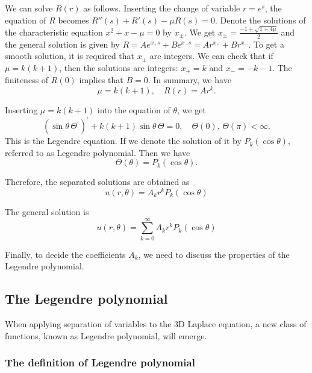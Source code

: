 We can solve $R(r)$ as follows. Inserting the change of variable $r = e^s$, the equation of $R$ becomes $R''(s) + R'(s) - \mu R(s) = 0$. Denote the solutions of the characteristic equation $x^2 + x - \mu = 0$ by $x_{\pm}$. We get $x_{\pm} = \frac{-1 \pm \sqrt{1 + 4\mu}}{2}$ and the general solution is given by $R = Ae^{x_+ s} + Be^{x_- s} = Ar^{x_+} + Br^{x_-}$. To get a smooth solution, it is required that $x_{\pm}$ are integers. We can check that if $\mu = k(k+1)$, then the solutions are integers: $x_+ = k$ and $x_- = -k-1$. The finiteness of $R(0)$ implies that $B = 0$. In summary, we have 
\begin{equation}\label{eq.solve_Laplace_3D_R}
    \mu = k(k+1),\quad R(r) = Ar^{k}.
\end{equation}

Inserting $\mu = k(k+1)$ into the equation of $\theta$, we get 
\begin{equation}\label{eq.Legendre'}
    (\sin\theta\,\Theta^{\prime})^{\prime}+k(k+1) \sin\theta\,\Theta=0, \quad \Theta(0),\, \Theta(\pi)  < \infty.
\end{equation}
This is the Legendre equation. If we denote the solution of it by $P_k(\cos\theta)$, referred to as Legendre polynomial. Then we have 
\begin{equation}\label{eq.solve_Laplace_3D_theta}
    \Theta(\theta) = P_k(\cos\theta).
\end{equation}

Therefore, the separated solutions are obtained as
\begin{equation}
u(r, \theta)= A_k r^k P_k(\cos\theta)
\end{equation}

The general solution is
$$
u(r, \theta)=\sum_{k = 0}^\infty A_k r^k P_k(\cos\theta)
$$

Finally, to decide the coefficients $A_k$, we need to discuss the properties of the Legendre polynomial.

\subsection{The Legendre polynomial}

When applying separation of variables to the 3D Laplace equation, a new class of functions, known as Legendre polynomial, will emerge.

\subsubsection{The definition of Legendre polynomial}

